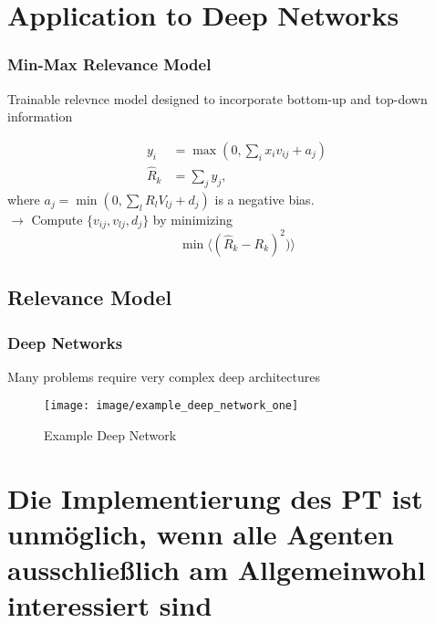 \documentclass{beamer}
\begin{document}
\section[Application to Deep Networks]{Application to Deep Networks}




\begin{frame}
\frametitle{Min-Max Relevance Model}
Trainable relevnce model designed to incorporate bottom-up and top-down information

\begin{align*}
y_i &= \max(0,\sum_ix_iv_{ij} + a_j)\\
\hat{R}_k &= \sum_j y_j,
\end{align*}
where $a_j = \min(0,\sum_l R_l V_{lj} + d_j)$ is a negative bias.\\
$\rightarrow$ Compute $\{v_{ij}, v_{lj},d_j\}$ by minimizing 
\begin{equation*}
\min\langle (\hat{R}_k-R_k)^2) \rangle
\end{equation*}
\vspace{-1cm}
\end{frame}

\subsection[Relevance Model]{Relevance Model}

\begin{frame}
\frametitle{Deep Networks}
Many problems require very complex deep architectures

\begin{figure}
\texttt{[image: image/example\_deep\_network\_one]}
\vspace{-0.25cm}
\caption{Example Deep Network}
\end{figure}

\vspace{-1cm}
\end{frame}





\section[ausschlie{\ss}lich Allgemeinwohl]{Die Implementierung des PT ist unm\"oglich, wenn alle Agenten ausschlie{\ss}lich am Allgemeinwohl interessiert sind} 
\end{document}
